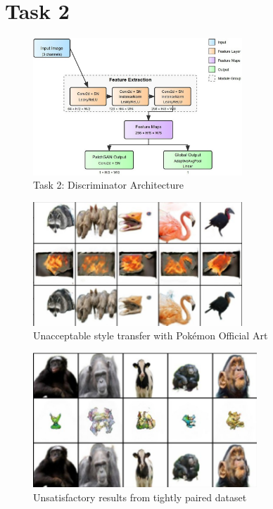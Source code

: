 \documentclass[twoside,english,notitlepage]{report}
\begin{document}
\section{Task 2}\label{task2:appendix}


\begin{figure}[h]
    \centering
    \includegraphics[width=0.7\textwidth]{task2/discriminatorArchitecture.jpg}
    \caption{Task 2: Discriminator Architecture}\label{task2:discriminator-architecture}
\end{figure}

\begin{figure}[h]
    \centering
    \includegraphics[width=0.7\textwidth]{task2/poke-fail1.jpg}
    \vspace{-10pt}
    \caption{Unacceptable style transfer with Pokémon Official Art}\label{fig:poke-fail1}
\end{figure}

\begin{figure}[H]
    \centering
    \vspace{-6pt}
    \includegraphics[width=0.75\textwidth]{task2/poke-fail2.jpg}
    \vspace{-10pt}
    \caption{Unsatisfactory results from tightly paired dataset}\label{fig:poke-fail2}
\end{figure}
\end{document}
